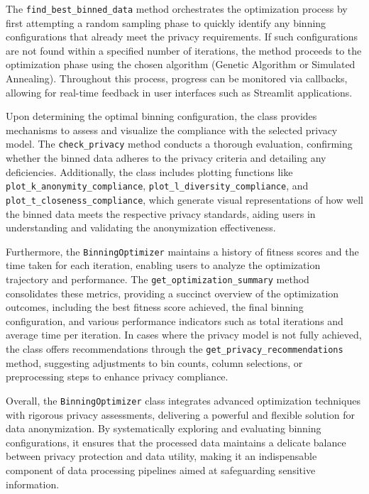 \documentclass{article}
\begin{document}
The \texttt{find\_best\_binned\_data} method orchestrates the optimization process by first attempting a random sampling phase to quickly identify any binning configurations that already meet the privacy requirements. If such configurations are not found within a specified number of iterations, the method proceeds to the optimization phase using the chosen algorithm (Genetic Algorithm or Simulated Annealing). Throughout this process, progress can be monitored via callbacks, allowing for real-time feedback in user interfaces such as Streamlit applications.

Upon determining the optimal binning configuration, the class provides mechanisms to assess and visualize the compliance with the selected privacy model. The \texttt{check\_privacy} method conducts a thorough evaluation, confirming whether the binned data adheres to the privacy criteria and detailing any deficiencies. Additionally, the class includes plotting functions like \texttt{plot\_k\_anonymity\_compliance}, \texttt{plot\_l\_diversity\_compliance}, and \texttt{plot\_t\_closeness\_compliance}, which generate visual representations of how well the binned data meets the respective privacy standards, aiding users in understanding and validating the anonymization effectiveness.

Furthermore, the \texttt{BinningOptimizer} maintains a history of fitness scores and the time taken for each iteration, enabling users to analyze the optimization trajectory and performance. The \texttt{get\_optimization\_summary} method consolidates these metrics, providing a succinct overview of the optimization outcomes, including the best fitness score achieved, the final binning configuration, and various performance indicators such as total iterations and average time per iteration. In cases where the privacy model is not fully achieved, the class offers recommendations through the \texttt{get\_privacy\_recommendations} method, suggesting adjustments to bin counts, column selections, or preprocessing steps to enhance privacy compliance.

Overall, the \texttt{BinningOptimizer} class integrates advanced optimization techniques with rigorous privacy assessments, delivering a powerful and flexible solution for data anonymization. By systematically exploring and evaluating binning configurations, it ensures that the processed data maintains a delicate balance between privacy protection and data utility, making it an indispensable component of data processing pipelines aimed at safeguarding sensitive information.
\end{document}
